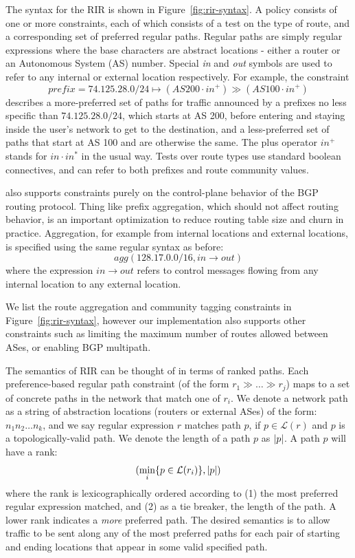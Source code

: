 
The syntax for the RIR is shown in Figure~\ref{fig:rir-syntax}. A policy consists of one or more constraints, each of which consists of a test on the type of route, and a corresponding set of preferred regular paths. Regular paths are simply regular expressions where the base characters are abstract locations - either a router or an Autonomous System (AS) number. Special \textit{in} and \textit{out} symbols are used to refer to any internal or external location respectively.
For example, the constraint
$$prefix=74.125.28.0/24 \mapsto (AS200 \cdot in^+) \gg (AS100 \cdot in^+)$$
describes a more-preferred set of paths for traffic announced by a prefixes no less specific than $74.125.28.0/24$, which starts at AS 200, before entering and staying inside the user's network to get to the destination, and a less-preferred set of paths that start at AS 100 and are otherwise the same. The plus operator $in^+$ stands for $in \cdot in^*$ in the usual way. Tests over route types use standard boolean connectives, and can refer to both prefixes and route community values.

\sysname also supports constraints purely on the control-plane behavior of the BGP routing protocol. Thing like prefix aggregation, which should not affect routing behavior, is an important optimization to reduce routing table size and churn in practice. Aggregation, for example from internal locations and external locations, is specified using the same regular syntax as before:
$$agg(128.17.0.0/16, in \rightarrow out)$$
where the expression $in \rightarrow out$ refers to control messages flowing from any internal location to any external location.

We list the route aggregation and community tagging constraints in Figure~\ref{fig:rir-syntax}, however our implementation also supports other constraints such as limiting the maximum number of routes allowed between ASes, or enabling BGP multipath.



The semantics of RIR can be thought of in terms of ranked paths. Each preference-based regular path constraint (of the form $r_1 \gg \dots \gg r_j$) maps to a set of concrete paths in the network that match one of $r_i$. We denote a network path as a string of abstraction locations (routers or external ASes) of the form: $n_1 n_2 \dots n_k$, and we say regular expression $r$ matches path $p$, if $p \in \mathcal{L}(r)$ and $p$ is a topologically-valid path. We denote the length of a path $p$ as $ \lvert p \rvert $. A path $p$ will have a rank:
$$(\min_i \{  p \in \mathcal{L}(r_i)  \} ,  \lvert p \rvert )$$
where the rank is lexicographically ordered according to (1) the most preferred regular expression matched, and (2) as a tie breaker, the length of the path. A lower rank indicates a \emph{more} preferred path. The desired semantics is to allow traffic to be sent along any of the most preferred paths for each pair of starting and ending locations that appear in some valid specified path.

